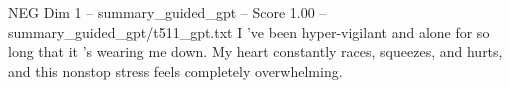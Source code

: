 \begin{textsample}{NEG Dim 1 – summary\_guided\_gpt – Score 1.00 – summary\_guided\_gpt/t511\_gpt.txt}  \label{ex:f1_neg_023}
I ’ve been hyper-vigilant and alone for so long that it ’s wearing me down.
My heart constantly races, squeezes, and hurts, and this nonstop stress feels completely overwhelming.

\end{textsample}
